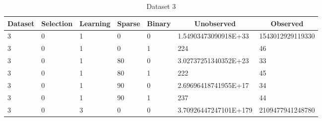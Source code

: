 \documentclass{article}
\theoremstyle{definition}
\begin{document}
\begin{table}[]
\centering
\caption{Dataset 3}
\label{my-label}
\begin{tabular}{|l|l|l|l|l|l|l|}
\hline
\multicolumn{1}{|c|}{\textbf{Dataset}} & \multicolumn{1}{c|}{\textbf{Selection}} & \multicolumn{1}{c|}{\textbf{Learning}} & \multicolumn{1}{c|}{\textbf{Sparse}} & \multicolumn{1}{c|}{\textbf{Binary}} & \multicolumn{1}{c|}{\textbf{Unobserved}} & \multicolumn{1}{c|}{\textbf{Observed}} \\ \hline

3                                      & 0                                       & 1                                      & 0                                    & 0                                      & 1.54903473090918E+33                     & 1543012929119330                       \\ \hline
3                                      & 0                                       & 1                                      & 0                                    & 1                                      & 224                                      & 46                                     \\ \hline
3                                      & 0                                       & 1                                      & 80                                   & 0                                      & 3.02737251340352E+23                     & 33                                     \\ \hline
3                                      & 0                                       & 1                                      & 80                                   & 1                                      & 222                                      & 45                                     \\ \hline
3                                      & 0                                       & 1                                      & 90                                   & 0                                      & 2.69696418741955E+17                     & 34                                     \\ \hline
3                                      & 0                                       & 1                                      & 90                                   & 1                                      & 237                                      & 44                                     \\ \hline
3                                      & 0                                       & 3                                      & 0                                    & 0                                      & 3.70926447247101E+179                    & 2109477941248780                       \\ \hline

\end{tabular}
\end{table}
\end{document}
